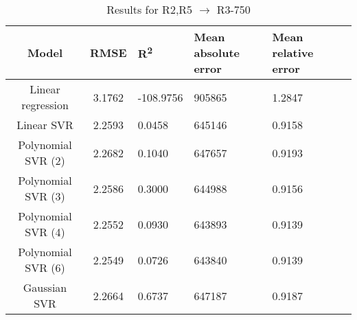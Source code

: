 \begin{table}[H]
\centering
\begin{adjustbox}{center}
\begin{tabular}{c | c M{1.2cm} M{2.5cm} M{2.5cm} M{1.8cm}}
Model & RMSE & R\textsuperscript{2} & Mean absolute error & Mean relative error \tabularnewline
\hline
Linear regression & 3.1762 & -108.9756 & 905865 & 1.2847 \\
Linear SVR & 2.2593 & 0.0458 & 645146 & 0.9158 \\
Polynomial SVR (2) & 2.2682 & 0.1040 & 647657 & 0.9193 \\
Polynomial SVR (3) & 2.2586 & 0.3000 & 644988 & 0.9156 \\
Polynomial SVR (4) & 2.2552 & 0.0930 & 643893 & 0.9139 \\
Polynomial SVR (6) & 2.2549 & 0.0726 & 643840 & 0.9139 \\
Gaussian SVR & 2.2664 & 0.6737 & 647187 & 0.9187 \\
\end{tabular}
\end{adjustbox}
\\
\caption{Results for R2,R5 $\rightarrow$ R3-750}
\label{tab:coreonly_linear_R2,R5_R3_750}
\end{table}

